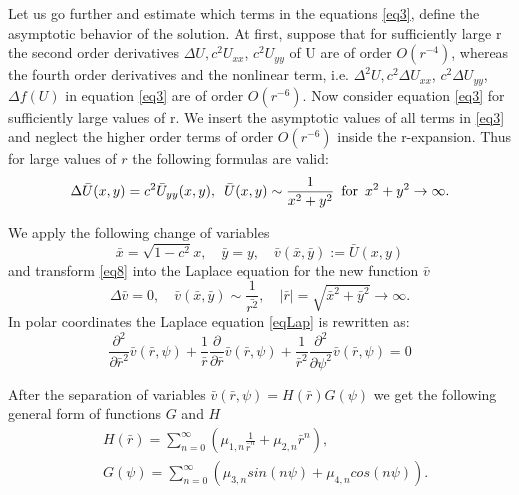 \documentclass[12pt]{article}
\theoremstyle{theorem}
\theoremstyle{defi}
\begin{document}
Let us go further and estimate which terms in the equations \eqref{eq3},  define the asymptotic behavior of the solution. At first, suppose that for sufficiently large r the second order derivatives $\Delta U , c^2U_{xx}$, $c^2U_{yy}$  of U are of order  $O(r^{-4})$, whereas the fourth order derivatives and the nonlinear term, i.e.  $\Delta^2 U , c^2\Delta U_{xx}$, $c^2\Delta U_{yy}$, $\Delta f(U)$    in equation \eqref{eq3} are of order $O(r^{-6})$.
Now consider equation \eqref{eq3} for sufficiently large values of r. We insert the asymptotic values of all terms in \eqref{eq3} and neglect the higher order terms of order $O(r^{-6})$ inside the r-expansion. Thus for large values of $r$ the following formulas are valid:
\begin{equation}
 \Delta \bar{U}(x,y) =   c^2   \bar{U}_{yy}(x,y) , \enskip  \bar{U}(x,y) \sim \frac{1}{x^2 + y^2} \enskip \text{for} \enskip x^2 + y^2 \rightarrow \infty . \label{eq8}
\end{equation}


We apply the following change of variables
\begin{equation}
\bar{x} = \sqrt{1-c^2}x , \quad  \bar{y} = y, \quad \bar{v}( \bar{x}, \bar{y}) := \bar{U} (x, y)\label{eqVC}
\end{equation}
and transform \eqref{eq8} into the Laplace equation for the new function $\bar{v}$
\begin{equation} \label{eqLap}
\Delta \bar{v} = 0, \quad \bar{v}( \bar{x}, \bar{y}) \sim \frac{1}{\bar{r^2}}, \quad |\bar{r}|=\sqrt{\bar{x}^2 + \bar{y}^2} \rightarrow \infty.
\end{equation}
In polar coordinates the Laplace equation \eqref{eqLap} is rewritten as:
\begin{equation} \label{eqLapPol}
\frac{\partial^2}{\partial \bar{r}^2} \bar{v}(\bar{r}, \psi) + \frac{1}{\bar{r}} \frac{\partial}{\partial \bar{r}}\bar{v}(\bar{r}, \psi) +  \frac{1}{\bar{r}^2} \frac{\partial^2}{\partial \psi^2} \bar{v}(\bar{r}, \psi) = 0
\end{equation}

After the separation of variables $\bar{v}(\bar{r}, \psi) = H(\bar{r})G(\psi)$  we get the following general form of functions $G$ and $H$
\begin{align}
&H(\bar{r}) = \sum^{\infty}_{n=0} (\mu_{1,n} \frac{1}{ \bar{r}^n} + \mu_{2,n} \bar{r}^n ),
\\ \nonumber &G(\psi) = \sum^{\infty}_{n=0} (\mu_{3,n}sin(n \psi ) + \mu_{4,n}cos(n \psi)). \label{eq9}
\end{align}
\end{document}
